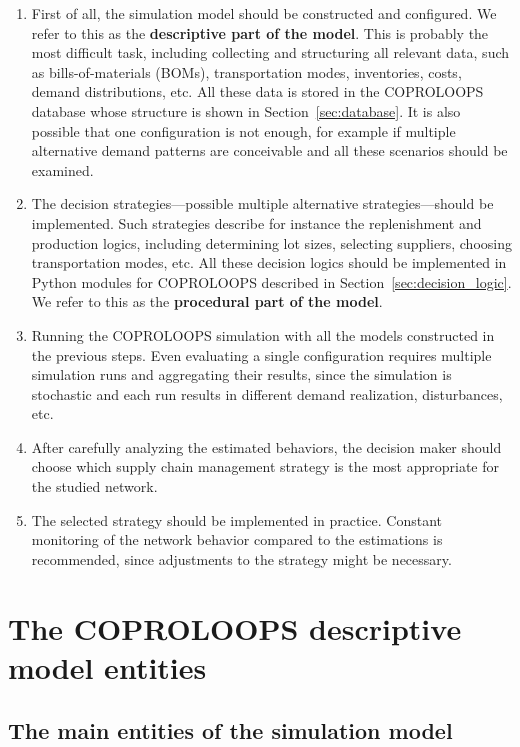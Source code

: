 \documentclass{article}
\newcommand{\NAME}{COPROLOOPS }
\begin{document}
\begin{enumerate}
\item First of all, the simulation model should be constructed and configured. We refer to this as the \textbf{descriptive part of the model}. This is probably the most difficult task, including collecting and structuring all relevant data, such as bills-of-materials (BOMs), transportation modes, inventories, costs, demand distributions, etc. All these data is stored in the \NAME database whose structure is shown in Section~\ref{sec:database}. It is also possible that one configuration is not enough, for example if multiple alternative demand patterns are conceivable and all these scenarios should be examined.

\item The decision strategies---possible multiple alternative strategies---should be implemented. Such strategies describe for instance the replenishment and production logics, including determining lot sizes, selecting suppliers, choosing transportation modes, etc. All these decision logics should be implemented in Python modules for \NAME described in Section~\ref{sec:decision_logic}. We refer to this as the \textbf{procedural part of the model}.

\item Running the \NAME simulation with all the models constructed in the previous steps. Even evaluating a single configuration requires multiple simulation runs and aggregating their results, since the simulation is stochastic and each run results in different demand realization, disturbances, etc.

\item After carefully analyzing the estimated behaviors, the decision maker should choose which supply chain management strategy is the most appropriate for the studied network.

\item The selected strategy should be implemented in practice. Constant monitoring of the network behavior compared to the estimations is recommended, since adjustments to the strategy might be necessary.
\end{enumerate}


\section{The \NAME descriptive model entities\label{sec:classes}}

\subsection{The main entities of the simulation model}
\end{document}
